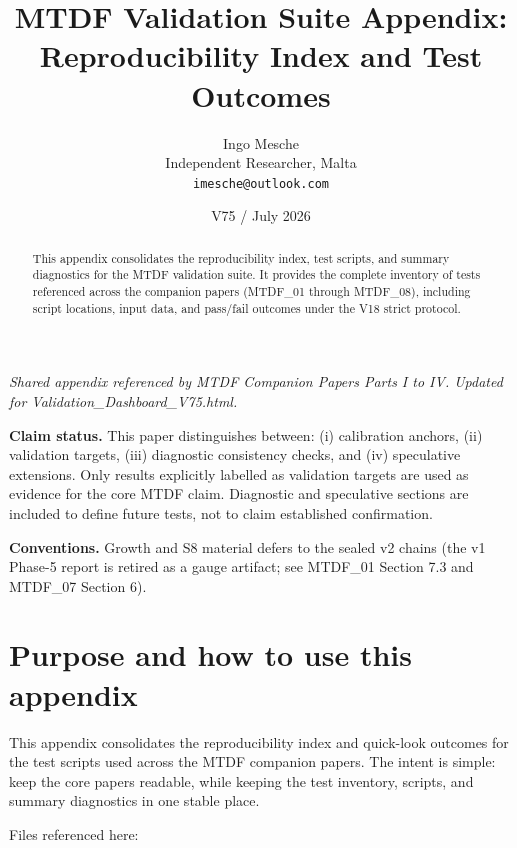 \documentclass[11pt,a4paper]{article}
\title{MTDF Validation Suite Appendix: Reproducibility Index and Test Outcomes}
\author{Ingo Mesche\\ \small Independent Researcher, Malta \\ \small \texttt{imesche@outlook.com}}
\date{V75 / July 2026}
\begin{document}
\maketitle
\begin{center}\itshape Shared appendix referenced by MTDF Companion Papers Parts I to IV. Updated for Validation\_\allowbreak{}Dashboard\_\allowbreak{}V75.html.\end{center}




\begin{abstract}
This appendix consolidates the reproducibility index, test scripts, and summary diagnostics for the MTDF validation suite. It provides the complete inventory of tests referenced across the companion papers (MTDF\_\allowbreak{}01 through MTDF\_\allowbreak{}08), including script locations, input data, and pass/\allowbreak{}fail outcomes under the V18 strict protocol.
\end{abstract}

\begin{mdframed}[linecolor=accent,linewidth=0.5pt,backgroundcolor=callout-bg,leftline=true,rightline=true,topline=true,bottomline=true,innerleftmargin=8pt,innerrightmargin=8pt,innertopmargin=6pt,innerbottommargin=6pt]
\textbf{Claim status.}
This paper distinguishes between:
(i) calibration anchors,
(ii) validation targets,
(iii) diagnostic consistency checks, and
(iv) speculative extensions.
Only results explicitly labelled as validation targets are used as evidence for the core MTDF claim. Diagnostic and speculative sections are included to define future tests, not to claim established confirmation.

\textbf{Conventions.} Growth and S8 material defers to the sealed v2 chains (the v1 Phase-5 report is retired as a gauge artifact; see MTDF\_\allowbreak{}01 Section 7.3 and MTDF\_\allowbreak{}07 Section 6).
\end{mdframed}


\section{Purpose and how to use this appendix}
This appendix consolidates the reproducibility index and quick-look outcomes for the test scripts used across the MTDF companion papers.
  The intent is simple: keep the core papers readable, while keeping the test inventory, scripts, and summary diagnostics in one stable place.

Files referenced here:
\end{document}
